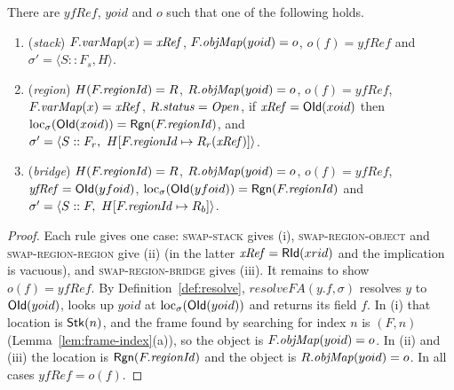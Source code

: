 \begin{lemma}
\label{lem:swap-cases}
There are $\mathit{yfRef}$, $yoid$ and $o$ such that one of the following holds.
\begin{enumerate}[nosep,label=(\roman*)]
  \item (\emph{stack}) $F.\mathit{varMap}(x) = \mathit{xRef}$, $F.\mathit{objMap}(yoid) = o$, $o(f) = \mathit{yfRef}$ and
    $\sigma' = \langle S :: F_s, H\rangle$.
  \item (\emph{region}) $H(F.\mathit{regionId}) = R$, $R.\mathit{objMap}(yoid) = o$, $o(f) = \mathit{yfRef}$,
    $F.\mathit{varMap}(x) = \mathit{xRef}$, $R.\mathit{status} = \mathit{Open}$, if $\mathit{xRef} = \mathsf{OId}(xoid)$ then
    $\mathrm{loc}_{\sigma}(\mathsf{OId}(xoid)) = \mathsf{Rgn}(F.\mathit{regionId})$, and
    $\sigma' = \langle S :: F_r,\ H[F.\mathit{regionId} \mapsto R_r(\mathit{xRef})]\rangle$.
  \item (\emph{bridge}) $H(F.\mathit{regionId}) = R$, $R.\mathit{objMap}(yoid) = o$, $o(f) = \mathit{yfRef}$,
    $\mathit{yfRef} = \mathsf{OId}(yfoid)$, $\mathrm{loc}_{\sigma}(\mathsf{OId}(yfoid)) = \mathsf{Rgn}(F.\mathit{regionId})$ and
    $\sigma' = \langle S :: F,\ H[F.\mathit{regionId} \mapsto R_b]\rangle$.
\end{enumerate}
\end{lemma}
\begin{proof}
Each rule gives one case: \textsc{swap-stack} gives (i), \textsc{swap-region-object} and
\textsc{swap-region-region} give (ii) (in the latter $\mathit{xRef} = \mathsf{RId}(xrid)$ and the implication
is vacuous), and \textsc{swap-region-bridge} gives (iii). It remains to show $o(f) = \mathit{yfRef}$.
By Definition~\ref{def:resolve}, $\mathit{resolveFA}(y.f, \sigma)$ resolves $y$ to $\mathsf{OId}(yoid)$, looks
up $yoid$ at $\mathrm{loc}_{\sigma}(\mathsf{OId}(yoid))$ and returns its field $f$. In (i) that location is $\mathsf{Stk}(n)$,
and the frame found by searching for index $n$ is $(F, n)$ (Lemma~\ref{lem:frame-index}(a)), so the
object is $F.\mathit{objMap}(yoid) = o$. In (ii) and (iii) the location is $\mathsf{Rgn}(F.\mathit{regionId})$ and the object is
$R.\mathit{objMap}(yoid) = o$. In all cases $\mathit{yfRef} = o(f)$.
\end{proof}

